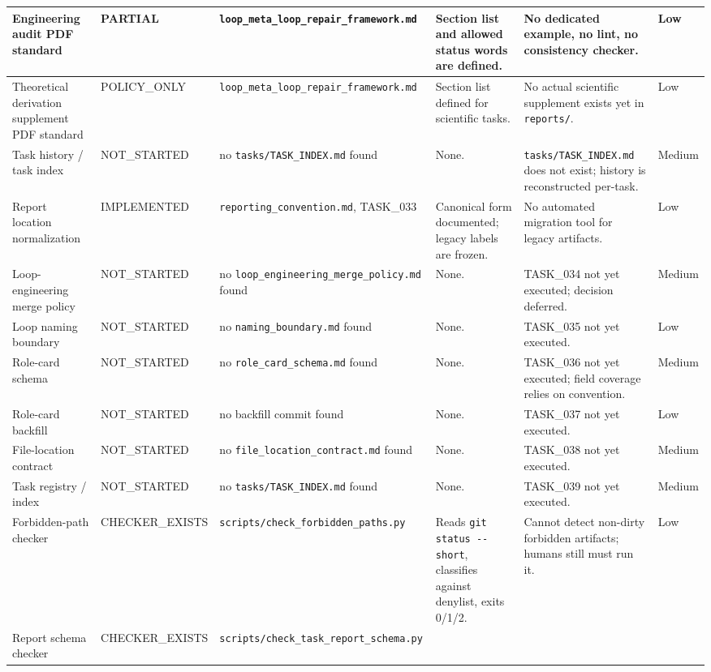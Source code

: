 \documentclass[11pt,a4paper]{article}
\begin{document}
\begin{longtable}{p{3.2cm} p{2.1cm} p{3.4cm} p{3.4cm} p{3.4cm} p{2.4cm}}
Engineering audit PDF standard &
  PARTIAL &
  \texttt{loop\_meta\_loop\_repair\_framework.md} &
  Section list and allowed status words are defined. &
  No dedicated example, no lint, no consistency checker. &
  Low \\ \hline
Theoretical derivation supplement PDF standard &
  POLICY\_ONLY &
  \texttt{loop\_meta\_loop\_repair\_framework.md} &
  Section list defined for scientific tasks. &
  No actual scientific supplement exists yet in
  \texttt{reports/}. &
  Low \\ \hline
Task history / task index &
  NOT\_STARTED &
  no \texttt{tasks/TASK\_INDEX.md} found &
  None. &
  \texttt{tasks/TASK\_INDEX.md} does not exist;
  history is reconstructed per-task. &
  Medium \\ \hline
Report location normalization &
  IMPLEMENTED &
  \texttt{reporting\_convention.md}, TASK\_033 &
  Canonical form documented; legacy labels are frozen. &
  No automated migration tool for legacy artifacts. &
  Low \\ \hline
Loop-engineering merge policy &
  NOT\_STARTED &
  no \texttt{loop\_engineering\_merge\_policy.md} found &
  None. &
  TASK\_034 not yet executed; decision deferred. &
  Medium \\ \hline
Loop naming boundary &
  NOT\_STARTED &
  no \texttt{naming\_boundary.md} found &
  None. &
  TASK\_035 not yet executed. &
  Low \\ \hline
Role-card schema &
  NOT\_STARTED &
  no \texttt{role\_card\_schema.md} found &
  None. &
  TASK\_036 not yet executed; field coverage relies on convention. &
  Medium \\ \hline
Role-card backfill &
  NOT\_STARTED &
  no backfill commit found &
  None. &
  TASK\_037 not yet executed. &
  Low \\ \hline
File-location contract &
  NOT\_STARTED &
  no \texttt{file\_location\_contract.md} found &
  None. &
  TASK\_038 not yet executed. &
  Medium \\ \hline
Task registry / index &
  NOT\_STARTED &
  no \texttt{tasks/TASK\_INDEX.md} found &
  None. &
  TASK\_039 not yet executed. &
  Medium \\ \hline
Forbidden-path checker &
  CHECKER\_EXISTS &
  \texttt{scripts/check\_forbidden\_paths.py} &
  Reads \texttt{git status -{}-short}, classifies against
  denylist, exits 0/1/2. &
  Cannot detect non-dirty forbidden artifacts; humans still
  must run it. &
  Low \\ \hline
Report schema checker &
  CHECKER\_EXISTS &
  \texttt{scripts/check\_task\_report\_schema.py} &

\end{longtable}
\end{document}
